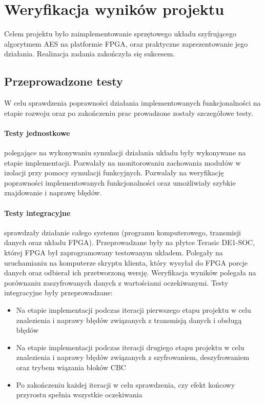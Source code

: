 \section{Weryfikacja wyników projektu}
\label{sec:weryfikacja-wynikow-projektu}
Celem projektu było zaimplementowanie sprzętowego układu szyfrującego algorytmem AES na platformie FPGA, oraz praktyczne zaprezentowanie jego działania. Realizacja zadania zakończyła się sukcesem.

\subsection{Przeprowadzone testy}
W celu sprawdzenia poprawności działania implementowanych funkcjonalności na etapie rozwoju oraz po zakończeniu prac prowadzone zostały szczegółowe testy.

\paragraph{Testy jednostkowe} polegające na wykonywaniu symulacji działania układu były wykonywane na etapie implementacji. Pozwalały na monitorowaniu zachowania modułów w izolacji przy pomocy symulacji funkcyjnych. Pozwalały na weryfikację poprawności implementowanych funkcjonalności oraz umożliwiały szybkie znajdowanie i naprawę błędów.

\paragraph{Testy integracyjne} sprawdzały działanie całego systemu (programu komputerowego, transmisji danych oraz układu FPGA). Przeprowadzane były na płytce Terasic DE1-SOC, której FPGA był zaprogramowany testowanym układem. Polegały na uruchamianiu na komputerze skryptu klienta, który wysyłał do FPGA porcje danych oraz odbierał ich przetworzoną wersję. Weryfikacja wyników polegała na porównaniu zaszyfrowanych danych z wartościami oczekiwanymi. Testy integracyjne były przeprowadzane:
\begin{itemize}
\item Na etapie implementacji podczas iteracji pierwszego etapu projektu w celu znalezienia i naprawy błędów związanych z transmisją danych i obsługą błędów
\item Na etapie implementacji podczas iteracji drugiego etapu projektu w celu znalezienia i naprawy błędów związanych z szyfrowaniem, deszyfrowaniem oraz trybem wiązania bloków CBC
\item Po zakończeniu każdej iteracji w celu sprawdzenia, czy efekt końcowy przyrostu spełnia wszystkie oczekiwania
\end{itemize}

